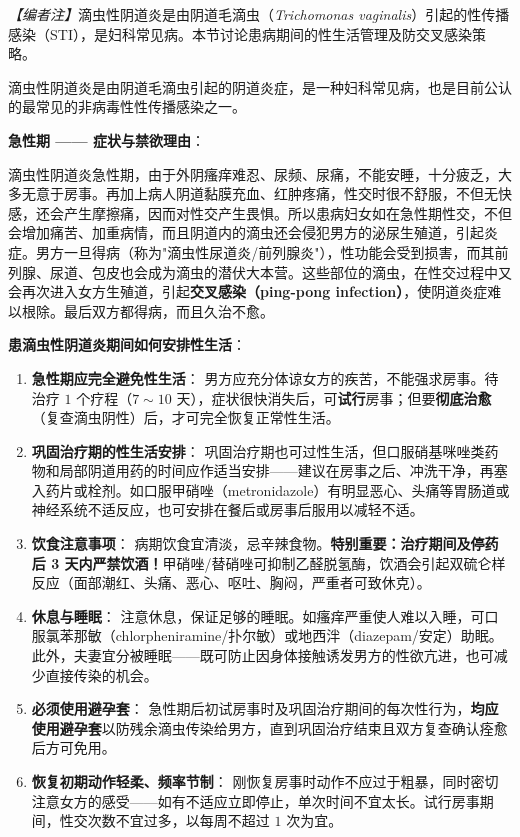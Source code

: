 \noindent\textit{【编者注】}滴虫性阴道炎是由阴道毛滴虫（\textit{Trichomonas vaginalis}）引起的性传播感染（STI），是妇科常见病。本节讨论患病期间的性生活管理及防交叉感染策略。

\vspace{0.5em}
滴虫性阴道炎是由阴道毛滴虫引起的阴道炎症，是一种妇科常见病，也是目前公认的最常见的非病毒性性传播感染之一。

\vspace{0.5em}
\noindent\textbf{急性期 —— 症状与禁欲理由}：

滴虫性阴道炎急性期，由于外阴瘙痒难忍、尿频、尿痛，不能安睡，十分疲乏，大多无意于房事。再加上病人阴道黏膜充血、红肿疼痛，性交时很不舒服，不但无快感，还会产生摩擦痛，因而对性交产生畏惧。所以患病妇女如在急性期性交，不但会增加痛苦、加重病情，而且阴道内的滴虫还会侵犯男方的泌尿生殖道，引起炎症。男方一旦得病（称为"滴虫性尿道炎/前列腺炎"），性功能会受到损害，而其前列腺、尿道、包皮也会成为滴虫的潜伏大本营。这些部位的滴虫，在性交过程中又会再次进入女方生殖道，引起\textbf{交叉感染（ping-pong infection）}，使阴道炎症难以根除。最后双方都得病，而且久治不愈。

\vspace{0.5em}
\noindent\textbf{患滴虫性阴道炎期间如何安排性生活}：

\begin{enumerate}
	\item \textbf{急性期应完全避免性生活}：
	男方应充分体谅女方的疾苦，不能强求房事。待治疗 $1$ 个疗程（$7\sim10$ 天），症状很快消失后，可\textbf{试行}房事；但要\textbf{彻底治愈}（复查滴虫阴性）后，才可完全恢复正常性生活。

	\item \textbf{巩固治疗期的性生活安排}：
	巩固治疗期也可过性生活，但口服硝基咪唑类药物和局部阴道用药的时间应作适当安排——建议在房事之后、冲洗干净，再塞入药片或栓剂。如口服甲硝唑（metronidazole）有明显恶心、头痛等胃肠道或神经系统不适反应，也可安排在餐后或房事后服用以减轻不适。

	\item \textbf{饮食注意事项}：
	病期饮食宜清淡，忌辛辣食物。\textbf{特别重要：治疗期间及停药后 3 天内严禁饮酒！}甲硝唑/替硝唑可抑制乙醛脱氢酶，饮酒会引起双硫仑样反应（面部潮红、头痛、恶心、呕吐、胸闷，严重者可致休克）。

	\item \textbf{休息与睡眠}：
	注意休息，保证足够的睡眠。如瘙痒严重使人难以入睡，可口服氯苯那敏（chlorpheniramine/扑尔敏）或地西泮（diazepam/安定）助眠。此外，夫妻宜分被睡眠——既可防止因身体接触诱发男方的性欲亢进，也可减少直接传染的机会。

	\item \textbf{必须使用避孕套}：
	急性期后初试房事时及巩固治疗期间的每次性行为，\textbf{均应使用避孕套}以防残余滴虫传染给男方，直到巩固治疗结束且双方复查确认痊愈后方可免用。

	\item \textbf{恢复初期动作轻柔、频率节制}：
	刚恢复房事时动作不应过于粗暴，同时密切注意女方的感受——如有不适应立即停止，单次时间不宜太长。试行房事期间，性交次数不宜过多，以每周不超过 $1$ 次为宜。
\end{enumerate}

